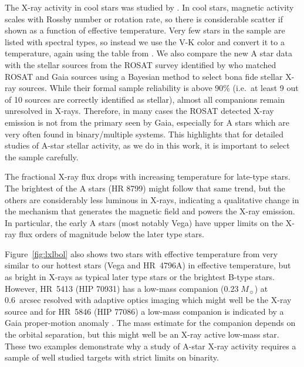\documentclass[linenumbers]{aastex631}
\begin{document}
The X-ray activity in cool stars was studied by \citet{2011ApJ...743...48W}. In cool stars, magnetic activity scales with Rossby number or rotation rate, so there is considerable scatter if shown as a function of effective temperature. Very few stars in the sample are listed with spectral types, so instead we use the V-K color and convert it to a temperature, again using the table from \citet{2013ApJS..208....9P}. 
We also compare the new A star data with the stellar sources from the ROSAT survey identified by \citet{Freund} who matched ROSAT and Gaia sources using a Bayesian method to select bona fide stellar X-ray sources. While their formal sample reliability is above 90\% (i.e.\ at least 9 out of 10 sources are correctly identified as stellar), almost all companions remain unresolved in X-rays. Therefore, in many cases the ROSAT detected X-ray emission is not from the primary seen by Gaia, especially for A stars which are very often found in binary/multiple systems. This highlights that for detailed studies of A-star stellar activity, as we do in this work, it is important to select the sample carefully.

The fractional X-ray flux drops with increasing temperature for late-type stars. The brightest of the A stars (HR 8799) might follow that same trend, but the others are considerably less luminous in X-rays, indicating a qualitative change in the mechanism that generates the magnetic field and powers the X-ray emission. In particular, the early A stars (most notably Vega) have upper limits on the X-ray flux orders of magnitude below the later type stars. 

Figure~\ref{fig:lxlbol} also shows two stars with effective temperature from \citet{1996A&AS..118..481B} very similar to our hottest stars (Vega and HR~4796A) in effective temperature, but as bright in X-rays as typical later type stars or the brightest B-type stars. However, HR~5413 (HIP 70931) has a low-mass companion ($0.23\;M_\sun$) at 0.6~arcsec resolved with adaptive optics imaging \citep{2014MNRAS.437.1216D} which might well be the X-ray source and for HR~5846 (HIP 77086) a low-mass companion is indicated by a Gaia proper-motion anomaly \citep{2019A&A...623A..72K}. The mass estimate for the companion depends on the orbital separation, but this might well be an X-ray active low-mass star. These two examples demonstrate why a study of A-star X-ray activity requires a sample of well studied targets with strict limits on binarity.
\end{document}
